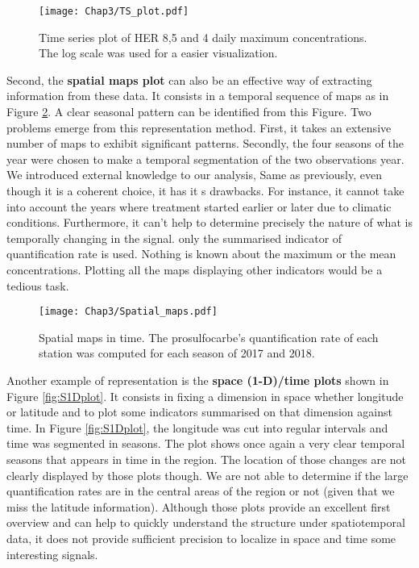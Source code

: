  \begin{figure}[ht]
    \centering
    \texttt{[image: Chap3/TS\_plot.pdf]}
    \caption{Time series plot of HER 8,5 and 4 daily maximum concentrations. The log scale was used for a easier visualization.}
    \label{fig:tsplot_ex}
\end{figure}
 
 Second, the \textbf{spatial maps plot} can also be an effective way of extracting information from these data. It consists in a temporal sequence of maps as in Figure \ref{fig:spa_ex}. A clear seasonal pattern can be identified from this Figure. Two problems emerge from this representation method. First, it takes an extensive number of maps to exhibit significant patterns. Secondly, the four seasons of the year were chosen to make a temporal segmentation of the two observations year. We introduced external knowledge to our analysis, Same as previously, even though it is a coherent choice, it has it s drawbacks. For instance, it cannot take into account the years where treatment started earlier or later due to climatic conditions. Furthermore, it can't help to determine precisely the nature of what is temporally changing in the signal. only the summarised indicator of quantification rate is used. Nothing is known about the maximum or the mean concentrations. Plotting all the maps displaying other indicators would be a tedious task.   

\begin{figure}[ht]
    \centering
    \texttt{[image: Chap3/Spatial\_maps.pdf]}
    \caption{Spatial maps in time. The prosulfocarbe's quantification rate of each station was computed for each season of 2017 and 2018.}
    \label{fig:spa_ex}
\end{figure}

Another example of representation is the \textbf{space (1-D)/time plots} shown in Figure \ref{fig:S1Dplot}. It consists in fixing a dimension in space whether longitude or latitude and to plot some indicators summarised on that dimension against time. In Figure \ref{fig:S1Dplot}, the longitude was cut into regular intervals and time was segmented in seasons. The plot shows once again a very clear temporal seasons that appears in time in the region. The location of those changes are not clearly displayed by those plots though. We are not able to determine if the large quantification rates are in the central areas of the region or not (given that we miss the latitude information). Although those plots provide an excellent first overview and can help to quickly understand the structure under spatiotemporal data, it does not provide sufficient precision to localize in space and time some interesting signals.    

